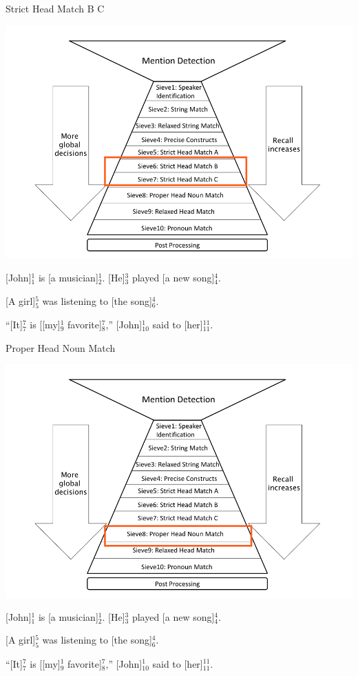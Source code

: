 \documentclass[11pt,a4paper]{beamer}
\begin{document}
\begin{frame}{Strict Head Match B C}

\includegraphics[scale=0.15]{sieve67.png} 
\bigskip

[John]$^{1}_{1}$ is [a musician]$^{1}_{2}$. [He]$^{3}_{3}$ played [a new song]$^{4}_{4}$.

[A girl]$^{5}_{5}$ was listening to [the song]$^{4}_{6}$.

“[It]$^{7}_{7}$ is [[my]$^{1}_{9}$ favorite]$^{7}_{8}$,” [John]$^{1}_{10}$ said to [her]$^{11}_{11}$.

\end{frame}

\begin{frame}{Proper Head Noun Match}

\includegraphics[scale=0.15]{sieve8.png} 
\bigskip

[John]$^{1}_{1}$ is [a musician]$^{1}_{2}$. [He]$^{3}_{3}$ played [a new song]$^{4}_{4}$.

[A girl]$^{5}_{5}$ was listening to [the song]$^{4}_{6}$.

“[It]$^{7}_{7}$ is [[my]$^{1}_{9}$ favorite]$^{7}_{8}$,” [John]$^{1}_{10}$ said to [her]$^{11}_{11}$.

\end{frame}
\end{document}
